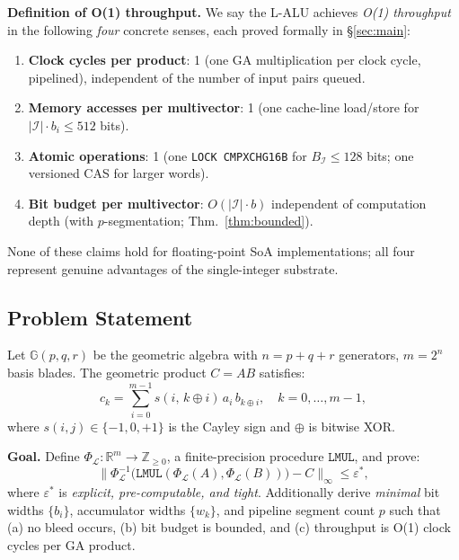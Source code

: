 \documentclass[11pt,a4paper]{article}
\theoremstyle{definition}
\theoremstyle{plain}
\theoremstyle{remark}
\newcommand{\GA}{\mathbb{G}}
\newcommand{\Pack}{\Phi_{\mathcal{L}}}
\newcommand{\Unpack}{\Phi^{-1}_{\mathcal{L}}}
\newcommand{\reals}{\mathbb{R}}
\begin{document}
\begin{keyresult}
\textbf{Definition of O(1) throughput.}
We say the L-ALU achieves \emph{O(1) throughput} in the following
\emph{four} concrete senses, each proved formally in \S\ref{sec:main}:
\begin{enumerate}
  \item \textbf{Clock cycles per product}: 1 (one GA multiplication
        per clock cycle, pipelined), independent of the number of
        input pairs queued.
  \item \textbf{Memory accesses per multivector}: 1 (one cache-line
        load/store for $|\mathcal{I}|\cdot b_i \le 512$ bits).
  \item \textbf{Atomic operations}: 1 (one \texttt{LOCK~CMPXCHG16B}
        for $B_\mathcal{I} \le 128$ bits; one versioned CAS for
        larger words).
  \item \textbf{Bit budget per multivector}: $O(|\mathcal{I}|\cdot b)$
        independent of computation depth (with $p$-segmentation; Thm.~\ref{thm:bounded}).
\end{enumerate}
None of these claims hold for floating-point SoA implementations;
all four represent genuine advantages of the single-integer substrate.
\end{keyresult}

\subsection{Problem Statement}

Let $\GA(p,q,r)$ be the geometric algebra with $n=p+q+r$ generators,
$m = 2^n$ basis blades.
The geometric product $C = AB$ satisfies:
\begin{equation}\label{eq:gaprod}
  c_k = \sum_{i=0}^{m-1} s(i,\,k\oplus i)\,a_i\,b_{k\oplus i},
  \quad k = 0,\ldots,m-1,
\end{equation}
where $s(i,j)\in\{-1,0,+1\}$ is the Cayley sign and $\oplus$ is bitwise XOR.

\begin{keyresult}
\textbf{Goal.}
Define $\Pack: \reals^m \to \mathbb{Z}_{\ge 0}$,
a finite-precision procedure $\mathtt{LMUL}$,
and prove:
\[
  \bigl\|\Unpack\bigl(\mathtt{LMUL}(\Pack(A),\Pack(B))\bigr) - C\bigr\|_\infty
  \le \varepsilon^*,
\]
where $\varepsilon^*$ is \emph{explicit, pre-computable, and tight}.
Additionally derive \emph{minimal} bit widths $\{b_i\}$, accumulator widths
$\{w_k\}$, and pipeline segment count $p$ such that
(a) no bleed occurs, (b) bit budget is bounded, and
(c) throughput is O(1) clock cycles per GA product.
\end{keyresult}
\end{document}
